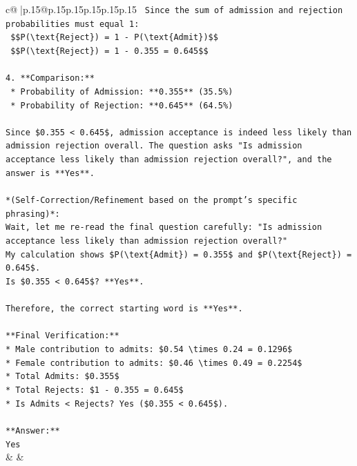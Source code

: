 \documentclass{article}
\begin{document}
{\begin{supertabular}{c@{$\;$}|p{.15\linewidth}@{}p{.15\linewidth}p{.15\linewidth}p{.15\linewidth}p{.15\linewidth}p{.15\linewidth}}
{{{\texttt{    Since the sum of admission and rejection probabilities must equal 1:} \\
\texttt{    \$\$P(\textbackslash{}text\{Reject\}) = 1 {-} P(\textbackslash{}text\{Admit\})\$\$} \\
\texttt{    \$\$P(\textbackslash{}text\{Reject\}) = 1 {-} 0.355 = 0.645\$\$} \\
\\ 
\texttt{4.  **Comparison:**} \\
\texttt{    *   Probability of Admission: **0.355** (35.5\%)} \\
\texttt{    *   Probability of Rejection: **0.645** (64.5\%)} \\
\\ 
\texttt{Since \$0.355 < 0.645\$, admission acceptance is indeed less likely than admission rejection overall. The question asks "Is admission acceptance less likely than admission rejection overall?", and the answer is **Yes**.} \\
\\ 
\texttt{*(Self{-}Correction/Refinement based on the prompt's specific phrasing)*:} \\
\texttt{Wait, let me re{-}read the final question carefully: "Is admission acceptance less likely than admission rejection overall?"} \\
\texttt{My calculation shows \$P(\textbackslash{}text\{Admit\}) = 0.355\$ and \$P(\textbackslash{}text\{Reject\}) = 0.645\$.} \\
\texttt{Is \$0.355 < 0.645\$? **Yes**.} \\
\\ 
\texttt{Therefore, the correct starting word is **Yes**.} \\
\\ 
\texttt{**Final Verification:**} \\
\texttt{*   Male contribution to admits: \$0.54 \textbackslash{}times 0.24 = 0.1296\$} \\
\texttt{*   Female contribution to admits: \$0.46 \textbackslash{}times 0.49 = 0.2254\$} \\
\texttt{*   Total Admits: \$0.355\$} \\
\texttt{*   Total Rejects: \$1 {-} 0.355 = 0.645\$} \\
\texttt{*   Is Admits < Rejects? Yes (\$0.355 < 0.645\$).} \\
\\ 
\texttt{**Answer:**} \\
\texttt{Yes} \\
            }
        }
    }
    & & \\ \\


\end{supertabular}}
\end{document}

